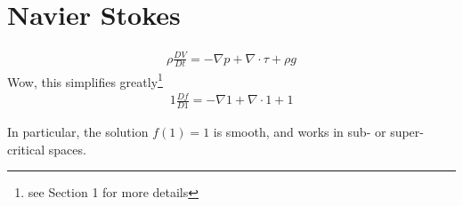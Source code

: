 \setcounter{section}{0}

\section{Navier Stokes}
\begin{align*}
  \rho \frac{D V}{D t}
  =-\nabla p + \nabla\cdot \tau+\rho g
\end{align*}
Wow, this simplifies greatly\footnote{see Section 1 for more details}
\begin{align*}
  1 \frac{D f}{D 1}
  =-\nabla 1 + \nabla\cdot 1+1
\end{align*}

In particular, the solution $f(1)=1$ is smooth, and works in 
sub- or super-critical spaces.
